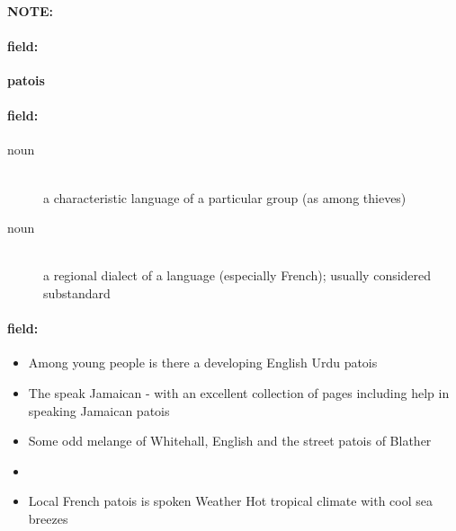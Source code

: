 \documentclass[12pt]{article}
\newenvironment{note}{\paragraph{NOTE:}}{}
\newenvironment{field}{\paragraph{field:}}{}
\begin{document}
\begin{note}
\begin{field}
\textbf{\large patois}
\end{field}


\begin{field}
\begin{description}
\item[noun] \hfill \\ 
a characteristic language of a particular group (as among thieves)

\item[noun] \hfill \\ 
a regional dialect of a language (especially French); usually considered substandard

\end{description}
\end{field}

\begin{field}
\begin{itemize}
\item Among young people is there a developing English Urdu patois
\item The speak Jamaican - with an excellent collection of pages including help in speaking Jamaican patois
\item Some odd melange of Whitehall, English and the street patois of Blather
\item 
\item Local French patois is spoken Weather Hot tropical climate with cool sea breezes
\end{itemize}
\end{field}
\end{note}
\end{document}
